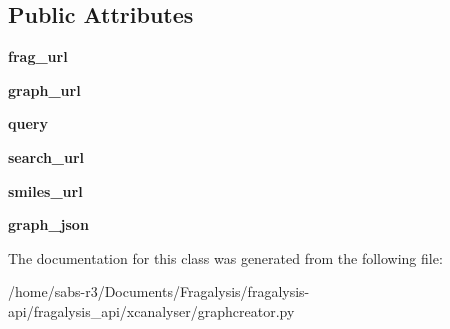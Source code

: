 \subsection*{Public Attributes}
\begin{DoxyCompactItemize}
\item 
\mbox{\label{classfragalysis__api_1_1xcanalyser_1_1graphcreator_1_1_graph_request_ac1d452fb3f9d6e80ba3a31e02145d043}} 
{\bfseries frag\+\_\+url}
\item 
\mbox{\label{classfragalysis__api_1_1xcanalyser_1_1graphcreator_1_1_graph_request_a8c195076876c81b0beada67b8757caf2}} 
{\bfseries graph\+\_\+url}
\item 
\mbox{\label{classfragalysis__api_1_1xcanalyser_1_1graphcreator_1_1_graph_request_a6f74c9499e8e158b9416880b3c7133a6}} 
{\bfseries query}
\item 
\mbox{\label{classfragalysis__api_1_1xcanalyser_1_1graphcreator_1_1_graph_request_a212573c4bde168c0fd5563124284e569}} 
{\bfseries search\+\_\+url}
\item 
\mbox{\label{classfragalysis__api_1_1xcanalyser_1_1graphcreator_1_1_graph_request_a9659e3db8ca34a5f3bb7c3186df87fe0}} 
{\bfseries smiles\+\_\+url}
\item 
\mbox{\label{classfragalysis__api_1_1xcanalyser_1_1graphcreator_1_1_graph_request_a564113897c119dfd6dcd066b12d1f481}} 
{\bfseries graph\+\_\+json}
\end{DoxyCompactItemize}


The documentation for this class was generated from the following file\+:\begin{DoxyCompactItemize}
\item 
/home/sabs-\/r3/\+Documents/\+Fragalysis/fragalysis-\/api/fragalysis\+\_\+api/xcanalyser/graphcreator.\+py\end{DoxyCompactItemize}
